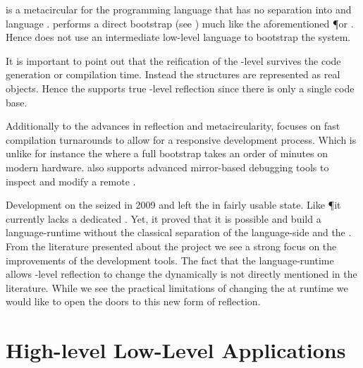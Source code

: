  is a metacircular \VM for the \Self programming language that has no separation into \VM and language \cite{Unga05a}.
\Klein performs a direct bootstrap (see ) much like the aforementioned \P or \MIST \VM.
Hence \Klein does not use an intermediate low-level language to bootstrap the system.

It is important to point out that the reification of the \VM-level survives the code generation or compilation time.
Instead the \VM structures are represented as real \Self objects.
Hence the \Klein \VM supports true \VM-level reflection since there is only a single code base.

Additionally to the advances in reflection and metacircularity, \Klein focuses on fast compilation turnarounds to allow for a responsive development process.
Which is unlike for instance the \Squeak \VM where a full \VM bootstrap takes an order of minutes on modern hardware.
\Klein also supports advanced mirror-based debugging tools to inspect and modify a remote \VM.

Development on the \Klein \VM seized in 2009 and left the \Klein \VM in fairly usable state.
Like \P it currently lacks a dedicated \GC.
Yet, it proved that it is possible and build a language-runtime without the classical separation of the language-side and the \VM.
From the literature presented about the \Klein project we see a strong focus on the improvements of the development tools.
The fact that the language-runtime allows \VM-level reflection to change the \VM dynamically is not directly mentioned in the literature.
While we see the practical limitations of changing the \VM at runtime we would like to open the doors to this new form of reflection.


\section{High-level Low-Level Applications}

